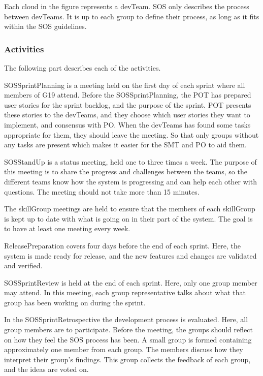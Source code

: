 Each cloud in the figure represents a \gls{devTeam}. \gls{SOS} only describes the process between \glspl{devTeam}. It is up to each group to define their process, as long as it fits within the \gls{SOS} guidelines.

\subsubsection{Activities}
The following part describes each of the activities.

\Gls{SOSSprintPlanning} is a meeting held on the first day of each sprint where all members of \Gls{G19} attend. Before the \Gls{SOSSprintPlanning}, the \gls{POT} has prepared user stories for the sprint backlog, and the purpose of the sprint. \gls{POT} presents these stories to the \glspl{devTeam}, and they choose which user stories they want to implement, and consensus with \gls{PO}. When the \glspl{devTeam} has found some tasks appropriate for them, they should leave the meeting. So that only groups without any tasks are present which makes it easier for the \gls{SMT} and \gls{PO} to aid them.

\Gls{SOSStandUp} is a status meeting, held one to three times a week. The purpose of this meeting is to share the progress and challenges between the teams, so the different teams know how the system is progressing and can help each other with questions. The meeting should not take more than 15 minutes.

The \Gls{skillGroup} meetings are held to ensure that the members of each \gls{skillGroup} is kept up to date with what is going on in their part of the system. The goal is to have at least one meeting every week.

\Gls{ReleasePreparation} covers four days before the end of each sprint. Here, the system is made ready for release, and the new features and changes are validated and verified.

\Gls{SOSSprintReview} is held at the end of each sprint. Here, only one group member may attend. In this meeting, each group representative talks about what that group has been working on during the sprint.

In the \gls{SOSSprintRetrospective} the development process is evaluated. Here, all group members are to participate. Before the meeting, the groups should reflect on how they feel the \gls{SOS} process has been. A small group is formed containing approximately one member from each group. The members discuss how they interpret their group's findings. This group collects the feedback of each group, and the ideas are voted on.

